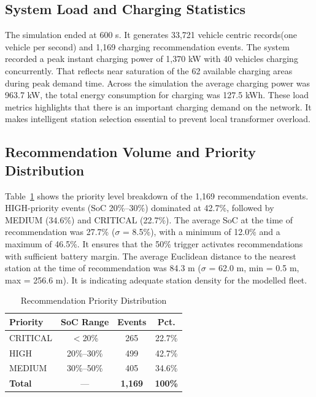 \documentclass[conference]{IEEEtran}
\begin{document}
\subsection{System Load and Charging Statistics}

The simulation ended at 600 s. It generates 33,721 vehicle centric
records(one vehicle per second) and 1,169 charging recommendation
events. The system recorded a peak instant charging power of 1,370 kW
with 40 vehicles charging concurrently. That reflects near saturation
of the 62 available charging areas during peak demand time. Across the
simulation the average charging power was 963.7 kW, the total energy
consumption for charging was 127.5 kWh. These load metrics highlights
that there is an important charging demand on the network. It makes
intelligent station selection essential to prevent local transformer
overload.

\subsection{Recommendation Volume and Priority Distribution}

Table~\ref{tab:priority} shows the priority level breakdown of the
1,169 recommendation events. HIGH-priority events (SoC 20\%--30\%)
dominated at 42.7\%, followed by MEDIUM (34.6\%) and CRITICAL (22.7\%).
The average SoC at the time of recommendation was 27.7\%
($\sigma$ = 8.5\%), with a minimum of 12.0\% and a maximum of 46.5\%.
It ensures that the 50\% trigger activates recommendations with
sufficient battery margin. The average Euclidean distance to the
nearest station at the time of recommendation was 84.3 m
($\sigma$ = 62.0 m, min = 0.5 m, max = 256.6 m). It is indicating
adequate station density for the modelled fleet.

\begin{table}[htbp]
\caption{Recommendation Priority Distribution}
\label{tab:priority}
\begin{center}
\small
\begin{tabular}{|l|c|c|c|}
\hline
\textbf{Priority} & \textbf{SoC Range} & \textbf{Events} & \textbf{Pct.} \\
\hline
CRITICAL & $<$20\%      & 265 & 22.7\% \\
\hline
HIGH     & 20\%--30\%   & 499 & 42.7\% \\
\hline
MEDIUM   & 30\%--50\%   & 405 & 34.6\% \\
\hline
\textbf{Total} & ---    & \textbf{1,169} & \textbf{100\%} \\
\hline
\end{tabular}
\end{center}
\end{table}
\end{document}

